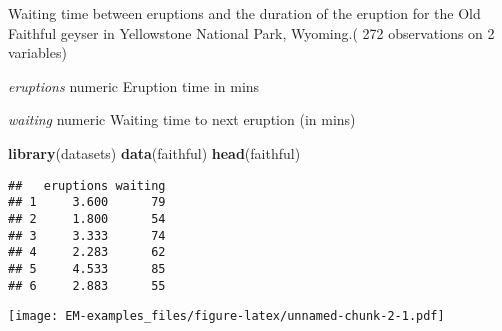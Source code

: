 \documentclass[]{article}
\newenvironment{Shaded}{\begin{snugshade}}{\end{snugshade}}
\newcommand{\DataTypeTok}[1]{\textcolor[rgb]{0.13,0.29,0.53}{#1}}
\newcommand{\DecValTok}[1]{\textcolor[rgb]{0.00,0.00,0.81}{#1}}
\newcommand{\FloatTok}[1]{\textcolor[rgb]{0.00,0.00,0.81}{#1}}
\newcommand{\KeywordTok}[1]{\textcolor[rgb]{0.13,0.29,0.53}{\textbf{#1}}}
\newcommand{\NormalTok}[1]{#1}
\newcommand{\OperatorTok}[1]{\textcolor[rgb]{0.81,0.36,0.00}{\textbf{#1}}}
\begin{document}
Waiting time between eruptions and the duration of the eruption for the
Old Faithful geyser in Yellowstone National Park, Wyoming.( 272
observations on 2 variables)

\emph{eruptions} numeric Eruption time in mins

\emph{waiting} numeric Waiting time to next eruption (in mins)

\begin{Shaded}
\begin{Highlighting}[]
\KeywordTok{library}\NormalTok{(datasets)}
\KeywordTok{data}\NormalTok{(faithful)}
\KeywordTok{head}\NormalTok{(faithful)}
\end{Highlighting}
\end{Shaded}

\begin{verbatim}
##   eruptions waiting
## 1     3.600      79
## 2     1.800      54
## 3     3.333      74
## 4     2.283      62
## 5     4.533      85
## 6     2.883      55
\end{verbatim}

\begin{Shaded}
\end{Shaded}

\texttt{[image: EM-examples\_files/figure-latex/unnamed-chunk-2-1.pdf]}

\begin{Shaded}
\end{Shaded}
\end{document}
